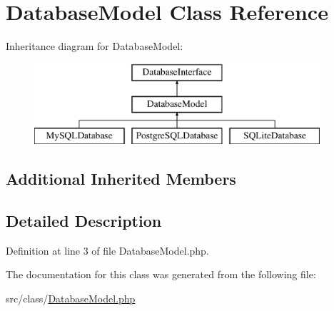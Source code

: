 \hypertarget{class_database_model}{}\section{Database\+Model Class Reference}
\label{class_database_model}
Inheritance diagram for Database\+Model\+:\begin{figure}[H]
\begin{center}
\leavevmode
\includegraphics[height=3.000000cm]{class_database_model}
\end{center}
\end{figure}
\subsection*{Additional Inherited Members}


\subsection{Detailed Description}


Definition at line 3 of file Database\+Model.\+php.



The documentation for this class was generated from the following file\+:\begin{DoxyCompactItemize}
\item 
src/class/\hyperlink{_database_model_8php}{Database\+Model.\+php}\end{DoxyCompactItemize}
